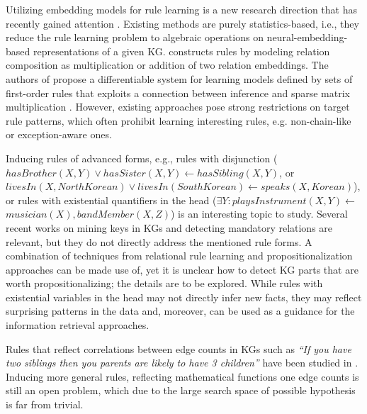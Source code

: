  Utilizing embedding models for rule learning is a new research direction that has recently gained attention \cite{DBLP:conf/nips/YangYC17,DBLP:journals/corr/YangYHGD14a}. Existing methods are purely statistics-based, i.e., they reduce the rule learning problem to algebraic operations on neural-embedding-based representations of a given KG.  \cite{DBLP:journals/corr/YangYHGD14a} constructs rules by modeling relation composition as multiplication or addition of two relation embeddings. The authors of \cite{DBLP:conf/nips/YangYC17} propose a differentiable system for learning models defined by sets of first-order rules that exploits a connection between inference and sparse matrix multiplication \cite{DBLP:journals/corr/Cohen16b}. However, existing approaches pose strong restrictions on target rule patterns, which often prohibit learning interesting rules, e.g. non-chain-like or exception-aware ones.

Inducing rules of  advanced forms, e.g., %
rules with disjunction (\eg $hasBrother(X,Y) \vee hasSister(X,Y) \leftarrow hasSibling(X,Y)$, or $livesIn(X, North Korean) \vee livesIn(South Korean) \leftarrow speaks(X, Korean) $), or rules with existential quantifiers in the head (\eg $\exists Y: playsInstrument(X, Y) \leftarrow$ $musician(X),bandMember(X,Z)$) is an interesting topic to study. Several recent works on mining keys in KGs \cite{vickey,DBLP:conf/www/LajusS18} and detecting mandatory relations are relevant, but they do not directly address the mentioned rule forms. A combination of techniques from relational rule learning \cite{DBLP:books/daglib/0021868} and propositionalization approaches \cite{propos} can be made use of, yet it is unclear how to detect KG parts that are worth propositionalizing; the details are to be explored. %
While rules with existential variables in the head may not directly infer new facts, they may reflect surprising patterns in the data and, moreover,  can be used as a guidance for the information retrieval approaches.

Rules that reflect correlations between edge counts in KGs such as \emph{``If you have two siblings then you parents are likely to have 3 children''} have been studied in \cite{carl}. Inducing more general rules, reflecting mathematical functions one edge counts is still an open problem, which due to the large search space of possible hypothesis is far from trivial.

